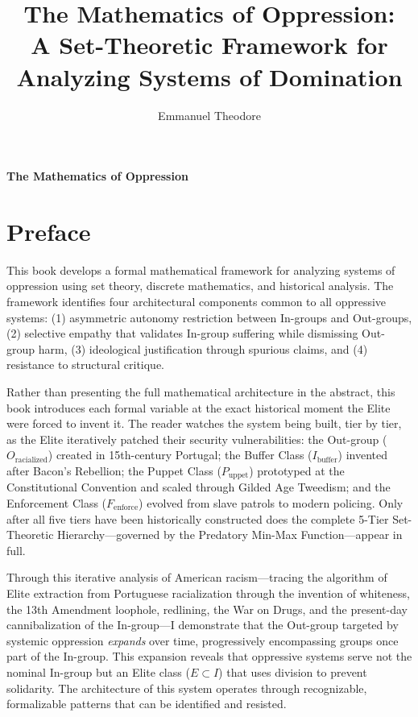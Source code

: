 \documentclass[12pt,openany]{book}
\title{The Mathematics of Oppression:\\A Set-Theoretic Framework for Analyzing Systems of Domination}
\author{Emmanuel Theodore}
\date{}
\begin{document}
\thispagestyle{empty}
\vspace*{\fill}
\begin{center}
{\Huge\bfseries The Mathematics of Oppression}
\end{center}
\vspace*{\fill}
\cleardoublepage

\maketitle

\frontmatter
\tableofcontents
\listoffigures

\chapter*{Preface}

This book develops a formal mathematical framework for analyzing systems of oppression using set theory, discrete mathematics, and historical analysis. The framework identifies four architectural components common to all oppressive systems: (1) asymmetric autonomy restriction between In-groups and Out-groups, (2) selective empathy that validates In-group suffering while dismissing Out-group harm, (3) ideological justification through spurious claims, and (4) resistance to structural critique.

Rather than presenting the full mathematical architecture in the abstract, this book introduces each formal variable at the exact historical moment the Elite were forced to invent it. The reader watches the system being built, tier by tier, as the Elite iteratively patched their security vulnerabilities: the Out-group ($O_{\text{racialized}}$) created in 15th-century Portugal; the Buffer Class ($I_{\text{buffer}}$) invented after Bacon's Rebellion; the Puppet Class ($P_{\text{uppet}}$) prototyped at the Constitutional Convention and scaled through Gilded Age Tweedism; and the Enforcement Class ($F_{\text{enforce}}$) evolved from slave patrols to modern policing. Only after all five tiers have been historically constructed does the complete 5-Tier Set-Theoretic Hierarchy---governed by the Predatory Min-Max Function---appear in full.

Through this iterative analysis of American racism---tracing the algorithm of Elite extraction from Portuguese racialization through the invention of whiteness, the 13th Amendment loophole, redlining, the War on Drugs, and the present-day cannibalization of the In-group---I demonstrate that the Out-group targeted by systemic oppression \textit{expands} over time, progressively encompassing groups once part of the In-group. This expansion reveals that oppressive systems serve not the nominal In-group but an Elite class ($E \subset I$) that uses division to prevent solidarity. The architecture of this system operates through recognizable, formalizable patterns that can be identified and resisted.
\end{document}
